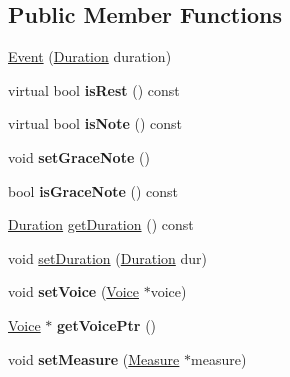 \subsection*{Public Member Functions}
\begin{DoxyCompactItemize}
\item 
\mbox{\hyperlink{classScoreModel_1_1Event_af639f7bb1366a3f8790da5ac2ef795fc}{Event}} (\mbox{\hyperlink{classScoreModel_1_1Duration}{Duration}} duration)
\item 
\mbox{\label{classScoreModel_1_1Event_ae326ab5efa2180f662548b4160360288}} 
virtual bool {\bfseries is\+Rest} () const
\item 
\mbox{\label{classScoreModel_1_1Event_ae831f2bf338cd2d68ff695541d20bb17}} 
virtual bool {\bfseries is\+Note} () const
\item 
\mbox{\label{classScoreModel_1_1Event_ae837a0111c2a45ecb1dead0f8018d2b5}} 
void {\bfseries set\+Grace\+Note} ()
\item 
\mbox{\label{classScoreModel_1_1Event_a114a671fc6a3f5ecfe4fbbde5a4758a0}} 
bool {\bfseries is\+Grace\+Note} () const
\item 
\mbox{\hyperlink{classScoreModel_1_1Duration}{Duration}} \mbox{\hyperlink{classScoreModel_1_1Event_a6dd98760396d0900719f2637ec27371a}{get\+Duration}} () const
\item 
void \mbox{\hyperlink{classScoreModel_1_1Event_a7f42996eca1339a85a8b6151bc426088}{set\+Duration}} (\mbox{\hyperlink{classScoreModel_1_1Duration}{Duration}} dur)
\item 
\mbox{\label{classScoreModel_1_1Event_a50e6b3aae286c87a9db3bc00c8b332c3}} 
void {\bfseries set\+Voice} (\mbox{\hyperlink{classScoreModel_1_1Voice}{Voice}} $\ast$voice)
\item 
\mbox{\label{classScoreModel_1_1Event_aa42a7bed6170ee53f28c89e54ce0f830}} 
\mbox{\hyperlink{classScoreModel_1_1Voice}{Voice}} $\ast$ {\bfseries get\+Voice\+Ptr} ()
\item 
\mbox{\label{classScoreModel_1_1Event_a842f6f7bd3140fc7fb469e5061a45d87}} 
void {\bfseries set\+Measure} (\mbox{\hyperlink{classScoreModel_1_1Measure}{Measure}} $\ast$measure)

\end{DoxyCompactItemize}
